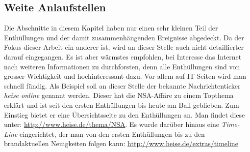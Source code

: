 \subsection{Weite Anlaufstellen}
Die Abschnitte in diesem Kapitel haben nur einen sehr kleinen Teil der Enthüllungen und der damit zusammenhängenden Ereignisse abgedeckt. Da der Fokus dieser Arbeit ein anderer ist, wird an dieser Stelle auch nicht detaillierter darauf eingegangen. Es ist aber wärmstes empfohlen, bei Interesse das Internet nach weiteren Informationen zu durchforsten, denn alle Enthüllungen sind von grosser Wichtigkeit und hochinteressant dazu. Vor allem auf IT-Seiten wird man schnell fündig. Als Beispiel soll an dieser Stelle der bekannte Nachrichtenticker \textit{heise online} genannt werden. Dieser hat die NSA-Affäre zu einem Topthema erklärt und ist seit den ersten Enthüllungen bis heute am Ball geblieben. Zum Einstieg bietet er eine Übersichtsseite zu den Enthüllungen an. Man findet diese unter: \url{http://www.heise.de/thema/NSA}. Es wurde darüber hinaus eine \textit{Time-Line} eingerichtet, der man von den ersten Enthüllungen bis zu den brandaktuellen Neuigkeiten folgen kann: \url{http://www.heise.de/extras/timeline}
